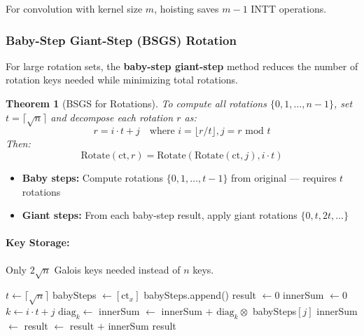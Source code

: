 \documentclass[11pt,a4paper]{article}
\newtheorem{theorem}{Theorem}
\newcommand{\bmod}{\text{ mod }}
\begin{document}
For convolution with kernel size $m$, hoisting saves $m - 1$ INTT operations.

\subsubsection{Baby-Step Giant-Step (BSGS) Rotation}

For large rotation sets, the \textbf{baby-step giant-step} method reduces the number of rotation keys needed while minimizing total rotations.

\begin{theorem}[BSGS for Rotations]
To compute all rotations $\{0, 1, \ldots, n-1\}$, set $t = \lceil \sqrt{n} \rceil$ and decompose each rotation $r$ as:
\[
r = i \cdot t + j \quad \text{where } i = \lfloor r/t \rfloor, j = r \bmod t
\]
Then:
\[
\text{Rotate}(\text{ct}, r) = \text{Rotate}(\text{Rotate}(\text{ct}, j), i \cdot t)
\]
\end{theorem}

\begin{itemize}
    \item \textbf{Baby steps:} Compute rotations $\{0, 1, \ldots, t-1\}$ from original — requires $t$ rotations
    \item \textbf{Giant steps:} From each baby-step result, apply giant rotations $\{0, t, 2t, \ldots\}$
\end{itemize}

\paragraph{Key Storage:} Only $2\sqrt{n}$ Galois keys needed instead of $n$ keys.

\begin{algorithm}[H]
\caption{BSGS Matrix-Vector Multiplication}
\begin{algorithmic}[1]
    \State $t \gets \lceil \sqrt{n} \rceil$
    \State
    \State {}
    \State babySteps $\gets [\text{ct}_x]$
        \State babySteps.append()
    \EndFor
    \State
    \State {}
    \State result $\gets 0$
        \State innerSum $\gets 0$
            \State $k \gets i \cdot t + j$
                \State $\text{diag}_k \gets$ 
                \State innerSum $\gets$ innerSum $+$ $\text{diag}_k \otimes$ babySteps$[j]$
            \EndIf
        \EndFor
            \State innerSum $\gets$ 
        \EndIf
        \State result $\gets$ result $+$ innerSum
    \EndFor
    \State \Return result
\EndFunction
\end{algorithmic}
\end{algorithm}
\end{document}
